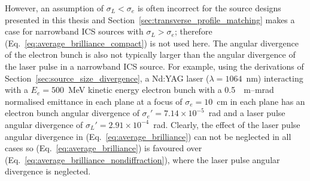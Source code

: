 \documentclass[../main.tex]{subfiles}
\begin{document}
However, an assumption of $\sigma_{L}<\sigma_{e}$ is often incorrect for the source designs presented in this thesis and Section~\ref{sec:transverse_profile_matching} makes a case for narrowband ICS sources with $\sigma_{L}>\sigma_{e}$; therefore (Eq.~\ref{eq:average_brilliance_compact}) is not used here. The angular divergence of the electron bunch is also not typically larger than the angular divergence of the laser pulse in a narrowband ICS source. For example, using the derivations of Section~\ref{sec:source_size_divergence}, a Nd:YAG laser ($\lambda = 1064$~\si{\nano\meter}) interacting with a $E_{e} = 500$~\si{\mega\electronvolt} kinetic energy electron bunch with a 0.5~\si{\mill\meter}--\si{\milli\radian} normalised emittance in each plane at a focus of $\sigma_{e} = 10$~\si{\centi\meter} in each plane has an electron bunch angular divergence of $\sigma_{e}' = 7.14\times10^{-5}$~\si{\radian} and a laser pulse angular divergence of $\sigma_{L}' = 2.91\times 10^{-4}$~\si{\radian}. Clearly, the effect of the laser pulse angular divergence in (Eq.~\ref{eq:average_brilliance}) can not be neglected in all cases so (Eq.~\ref{eq:average_brilliance}) is favoured over (Eq.~\ref{eq:average_brilliance_nondiffraction}), where the laser pulse angular divergence is neglected.  
\end{document}
